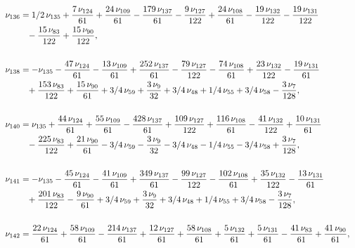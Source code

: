 \documentclass[a4paper,12pt, DIV=14, BCOR=5mm, twoside, headsepline]{scrbook}
\begin{document}
\begin{align}
\begin{aligned}
\\
\nu_{{136}}&=1/2\,\nu_{{135}}+{
\frac {7\,\nu_{{124}}}{61}}+{\frac {24\,\nu_{{109}}}{61}}-{\frac {179
\,\nu_{{137}}}{61}}-{\frac {9\,\nu_{{127}}}{122}}+{\frac {24\,\nu_{{
108}}}{61}}-{\frac {19\,\nu_{{132}}}{122}}-{\frac {19\,\nu_{{131}}}{
122}}\\
 &\hphantom{=}-{\frac {15\,\nu_{{83}}}{122}}+{\frac {15\,\nu_{{90}}}{122}}, \\
\\
\nu_
{{138}}&=-\nu_{{135}}-{\frac {47\,\nu_{{124}}}{61}}-{\frac {13\,\nu_{{
109}}}{61}}+{\frac {252\,\nu_{{137}}}{61}}-{\frac {79\,\nu_{{127}}}{
122}}-{\frac {74\,\nu_{{108}}}{61}}+{\frac {23\,\nu_{{132}}}{122}}-{
\frac {19\,\nu_{{131}}}{61}}\\
 &\hphantom{=}+{\frac {153\,\nu_{{83}}}{122}}+{\frac {15
\,\nu_{{90}}}{61}}+3/4\,\nu_{{59}}+{\frac {3\,\nu_{{9}}}{32}}+3/4\,\nu
_{{48}}+1/4\,\nu_{{55}}+3/4\,\nu_{{58}}-{\frac {3\,\nu_{{7}}}{128}},\\
\\
\nu_{{140}}&=\nu_{{135}}+{\frac {44\,\nu_{{124}}}{61}}+{\frac {55\,\nu_
{{109}}}{61}}-{\frac {428\,\nu_{{137}}}{61}}+{\frac {109\,\nu_{{127}}
}{122}}+{\frac {116\,\nu_{{108}}}{61}}-{\frac {41\,\nu_{{132}}}{122}}+
{\frac {10\,\nu_{{131}}}{61}}\\
 &\hphantom{=}-{\frac {225\,\nu_{{83}}}{122}}+{\frac {
21\,\nu_{{90}}}{61}}-3/4\,\nu_{{59}}-{\frac {3\,\nu_{{9}}}{32}}-3/4\,
\nu_{{48}}-1/4\,\nu_{{55}}-3/4\,\nu_{{58}}+{\frac {3\,\nu_{{7}}}{128}},\\
\\
\nu_{{141}}&=-\nu_{{135}}-{\frac {45\,\nu_{{124}}}{61}}-{\frac {41\,
\nu_{{109}}}{61}}+{\frac {349\,\nu_{{137}}}{61}}-{\frac {99\,\nu_{{127
}}}{122}}-{\frac {102\,\nu_{{108}}}{61}}+{\frac {35\,\nu_{{132}}}{122}
}-{\frac {13\,\nu_{{131}}}{61}}\\
 &\hphantom{=}+{\frac {201\,\nu_{{83}}}{122}}-{\frac 
{9\,\nu_{{90}}}{61}}+3/4\,\nu_{{59}}+{\frac {3\,\nu_{{9}}}{32}}+3/4\,
\nu_{{48}}+1/4\,\nu_{{55}}+3/4\,\nu_{{58}}-{\frac {3\,\nu_{{7}}}{128}},\\
\\
\nu_{{142}}&={\frac {22\,\nu_{{124}}}{61}}+{\frac {58\,\nu_{{109}}}{61
}}-{\frac {214\,\nu_{{137}}}{61}}+{\frac {12\,\nu_{{127}}}{61}}+{
\frac {58\,\nu_{{108}}}{61}}+{\frac {5\,\nu_{{132}}}{61}}+{\frac {5\,
\nu_{{131}}}{61}}-{\frac {41\,\nu_{{83}}}{61}}+{\frac {41\,\nu_{{90}}
}{61}}, 
\end{aligned}
\end{align}
\end{document}

